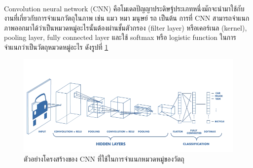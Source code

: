 Convolution neural network (CNN)\textsuperscript{\cite{cnn}} คือโมเดลปัญญาประดิษฐ์ประเภทหนึ่งมักจะนำมาใช้กับงานที่เกี่ยวกับการจำแนกวัตถุในภาพ เช่น แมว หมา มนุษย์ รถ เป็นต้น
การที่ CNN สามารถจำแนกภาพออกมาได้ว่าเป็นหมวดหมู่อะไรนั้นต้องผ่านชั้นตัวกรอง (filter layer) หรือเคอร์เนล (kernel), pooling layer, fully connected layer 
และใช้ softmax หรือ logistic function ในการจำแนกว่าเป็นวัตถุหมวดหมู่อะไร ดังรูปที่ \ref{fig:CNN architecture}

\begin{figure}[!ht]
	\centering
	\includegraphics[width=1\textwidth]{chapter2/images/CNN.png}
		\caption{ตัวอย่างโครงสร้างของ CNN ที่ใช้ในการจำแนกหมวดหมู่ของวัตถุ}
    	\label{fig:CNN architecture}
\end{figure}

